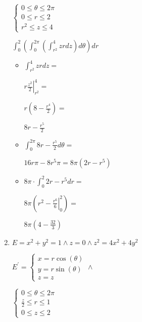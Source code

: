 \documentclass[../practica_09.tex]{subfiles}
\begin{document}
\begin{enumerate}
            $ \left\{
                \begin{array}{ll}
                    0 \leq \theta \leq 2\pi\\
                    0 \leq r \leq 2\\
                    r^2 \leq z \leq 4
                \end{array}
            \right. $

            $ \int_0^2 ( \int_0^{2\pi} (\int_{r^2}^4 zr dz ) d\theta) dr $

            \begin{itemize}
                \item $\int_{r^2}^4 zr dz = $
                
                    $ r \left. \frac{z^2}{2} \right |_{r^2}^4 = $

                    $ r ( 8 - \frac{r^4}{2}) = $

                    $ 8r - \frac{r^5}{2} $

                \item $ \int_0^{2\pi} 8r - \frac{r^5}{2} d\theta = $
                
                    $ 16r\pi - 8r^5\pi = 8\pi(2r - r^5)$

                \item $8\pi \cdot \int_0^2 2r - r^5 dr = $
                
                    $8\pi (\left. r^2 - \frac{r^6}{6}  \right |_0^2) = $

                    $ 8\pi (4 - \frac{32}{3})$

            \end{itemize}
    
        \item $E= x^2+y^2=1 \wedge z = 0 \wedge z^2=4x^2+4y^2$
        
        $E^{\prime} =  \left\{
            \begin{array}{ll}
                x = r\cos(\theta)\\
                y = r\sin(\theta)\\
                z = z
            \end{array}
        \right. \wedge $

        $ \left\{
            \begin{array}{ll}
                0 \leq \theta \leq 2\pi\\
                \frac{z}{2} \leq r \leq 1\\
                0 \leq z \leq 2
            \end{array}
        \right. $


\end{enumerate}
\end{document}
